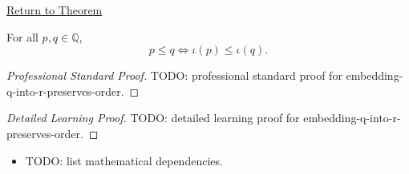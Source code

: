 \newpage
{}
\label{prf:embedding-q-into-r-preserves-order}

\begin{remark*}[Return]
\hyperref[thm:embedding-q-into-r-preserves-order]{Return to Theorem}
\end{remark*}

\begin{theorem*}
For all $p,q\in\mathbb{Q}$,
\[
p\le q \Longleftrightarrow \iota(p)\le\iota(q).
\]
\end{theorem*}

\begin{proof}[Professional Standard Proof]
\LRAProofBodyStart
TODO: professional standard proof for embedding-q-into-r-preserves-order.
\end{proof}

\begin{proof}[Detailed Learning Proof]
\LRAProofBodyStart
TODO: detailed learning proof for embedding-q-into-r-preserves-order.
\end{proof}

\begin{remark*}
\end{remark*}

\begin{dependencies}
\begin{itemize}
  \item TODO: list mathematical dependencies.
\end{itemize}
\end{dependencies}

\clearpage
